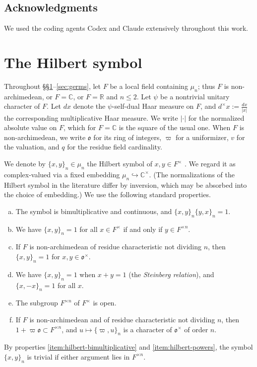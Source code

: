 \documentclass[reqno]{amsart}
\theoremstyle{plain}
\theoremstyle{definition}
\theoremstyle{itplain}
\numberwithin{equation}{section}
\numberwithin{theorem}{section}
\begin{document}
\subsection{Acknowledgments}\label{sec:acknowledgments}

We used the coding agents Codex and Claude extensively throughout this work.



\section{The Hilbert symbol}\label{sec:hilbert-symbol}
Throughout \S\S\ref{sec:hilbert-symbol}--\ref{sec:germs}, let $F$ be a local field containing $\mu_n$; thus $F$ is non-archimedean, or $F = \mathbb{C}$, or $F = \mathbb{R}$ and $n \leq 2$.  Let $\psi$ be a nontrivial unitary character of $F$.  Let $d x$ denote the $\psi$-self-dual Haar measure on $F$, and $d^\times x := \frac{d x}{\lvert x \rvert}$ the corresponding multiplicative Haar measure.  We write $\lvert \cdot \rvert$ for the normalized absolute value on $F$, which for $F = \mathbb{C}$ is the square of the usual one.  When $F$ is non-archimedean, we write $\mathfrak{o}$ for its ring of integers, $\varpi$ for a uniformizer, $v$ for the valuation, and $q$ for the residue field cardinality.

We denote by $\{x, y\}_n \in \mu_n$ the Hilbert symbol of $x, y \in F^\times$ \cite[Ch.~V, \S3]{MR1697859}.  We regard it as complex-valued via a fixed embedding $\mu_n \hookrightarrow \mathbb{C}^\times$.  (The normalizations of the Hilbert symbol in the literature differ by inversion, which may be absorbed into the choice of embedding.)  We use the following standard properties.
\begin{enumerate}[(a)]
\item\label{item:hilbert-bimultiplicative} The symbol is bimultiplicative and continuous, and $\{x, y\}_n \{y, x\}_n = 1$.
\item\label{item:hilbert-powers} We have $\{x, y\}_n = 1$ for all $x \in F^\times$ if and only if $y \in F^{\times n}$.
\item\label{item:hilbert-units} If $F$ is non-archimedean of residue characteristic not dividing $n$, then $\{x, y\}_n = 1$ for $x, y \in \mathfrak{o}^\times$.
\item\label{item:hilbert-steinberg} We have $\{x, y\}_n = 1$ when $x + y = 1$ (the \emph{Steinberg relation}), and $\{x, -x\}_n = 1$ for all $x$.
\item\label{item:hilbert-open} The subgroup $F^{\times n}$ of $F^\times$ is open.
\item\label{item:hilbert-tame} If $F$ is non-archimedean and of residue characteristic not dividing $n$, then $1 + \varpi \mathfrak{o} \subset F^{\times n}$, and $u \mapsto \{\varpi, u\}_n$ is a character of $\mathfrak{o}^\times$ of order $n$.
\end{enumerate}
By properties \eqref{item:hilbert-bimultiplicative} and \eqref{item:hilbert-powers}, the symbol $\{x, y\}_n$ is trivial if either argument lies in $F^{\times n}$.
\end{document}
